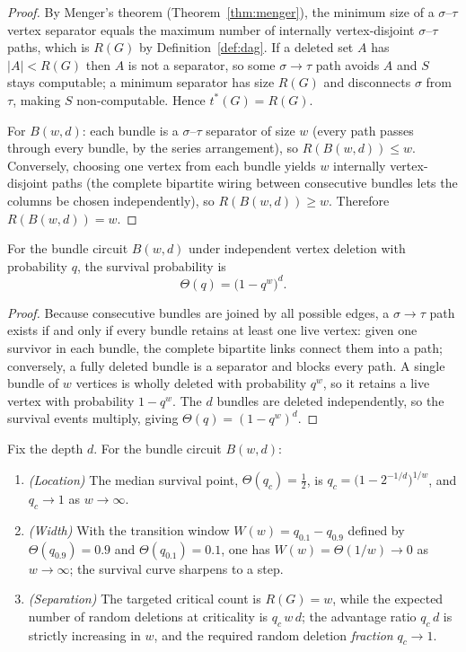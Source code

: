 \begin{proof}
By Menger's theorem (Theorem~\ref{thm:menger}), the minimum size of a
$\sigma$--$\tau$ vertex separator equals the maximum number of internally
vertex-disjoint $\sigma$--$\tau$ paths, which is $R(G)$ by Definition~\ref{def:dag}.
If a deleted set $A$ has $\lvert A\rvert<R(G)$ then $A$ is not a separator, so some
$\sigma\to\tau$ path avoids $A$ and $S$ stays computable; a minimum separator has size
$R(G)$ and disconnects $\sigma$ from $\tau$, making $S$ non-computable. Hence
$t^*(G)=R(G)$.

For $B(w,d)$: each bundle is a $\sigma$--$\tau$ separator of size $w$ (every path
passes through every bundle, by the series arrangement), so $R(B(w,d))\le w$.
Conversely, choosing one vertex from each bundle yields $w$ internally
vertex-disjoint paths (the complete bipartite wiring between consecutive bundles lets
the columns be chosen independently), so $R(B(w,d))\ge w$. Therefore
$R(B(w,d))=w$.
\end{proof}

\begin{theorem}
\label{thm:c2}
For the bundle circuit $B(w,d)$ under independent vertex deletion with probability
$q$, the survival probability is
\[
  \Theta(q)=\bigl(1-q^w\bigr)^d.
\]
\end{theorem}

\begin{proof}
Because consecutive bundles are joined by all possible edges, a $\sigma\to\tau$ path
exists if and only if every bundle retains at least one live vertex: given one
survivor in each bundle, the complete bipartite links connect them into a path;
conversely, a fully deleted bundle is a separator and blocks every path. A single
bundle of $w$ vertices is wholly deleted with probability $q^w$, so it retains a live
vertex with probability $1-q^w$. The $d$ bundles are deleted independently, so the
survival events multiply, giving $\Theta(q)=(1-q^w)^d$.
\end{proof}

\begin{theorem}
\label{thm:c3}
Fix the depth $d$. For the bundle circuit $B(w,d)$:
\begin{enumerate}[label=(\arabic*)]
  \item \emph{(Location)} The median survival point, $\Theta(q_c)=\tfrac12$, is
    $q_c=\bigl(1-2^{-1/d}\bigr)^{1/w}$, and $q_c\to 1$ as $w\to\infty$.
  \item \emph{(Width)} With the transition window
    $W(w)=q_{0.1}-q_{0.9}$ defined by $\Theta(q_{0.9})=0.9$ and
    $\Theta(q_{0.1})=0.1$, one has $W(w)=\Theta(1/w)\to 0$ as $w\to\infty$; the
    survival curve sharpens to a step.
  \item \emph{(Separation)} The targeted critical count is $R(G)=w$, while the
    expected number of random deletions at criticality is $q_c\,w\,d$; the advantage
    ratio $q_c\,d$ is strictly increasing in $w$, and the required random deletion
    \emph{fraction} $q_c\to 1$.
\end{enumerate}
\end{theorem}

